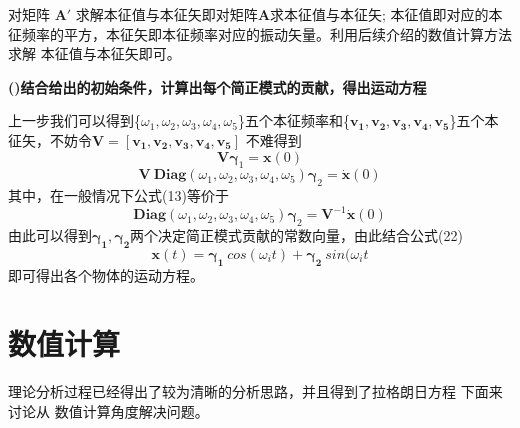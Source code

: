 \documentclass[11pt, a4paper, oneside]{ctexart}
\begin{document}
{    对矩阵 $\boldsymbol A'$ 求解本征值与本征矢即对矩阵$\boldsymbol A$求本征值与本征矢;
    本征值即对应的本征频率的平方，本征矢即本征频率对应的振动矢量。利用后续介绍的数值计算方法求解
    本征值与本征矢即可。




\vspace{5mm}
\textbf{()结合给出的初始条件，计算出每个简正模式的贡献，得出运动方程}
\vspace{5mm}

上一步我们可以得到\{$\omega_1,\omega_2,\omega_3,\omega_4,\omega_5$\}五个本征频率和\{$\boldsymbol{v_1,v_2,v_3,v_4,v_5}$\}五个本征矢，不妨令$\boldsymbol {V}=[\boldsymbol{v_1,v_2,v_3,v_4,v_5}]$
不难得到
\begin{equation}
    \boldsymbol {V} \boldsymbol\gamma_1 = \boldsymbol x(0)
\end{equation}
\begin{equation}
    \boldsymbol {V}\  \boldsymbol {Diag}(\omega_1,\omega_2,\omega_3,\omega_4,\omega_5)\boldsymbol\gamma_2 = \boldsymbol{\dot x}(0) 
\end{equation}
其中，在一般情况下公式(13)等价于
\begin{equation}
    \boldsymbol {Diag}(\omega_1,\omega_2,\omega_3,\omega_4,\omega_5)\boldsymbol\gamma_2 = \boldsymbol {V}^{-1} \boldsymbol{\dot x}(0) 
\end{equation}
由此可以得到$\boldsymbol{\gamma_1,\gamma_2}$两个决定简正模式贡献的常数向量，由此结合公式(22)
$$
    \bm x(t)=\bm{\gamma_{1}}\ cos(\omega_it)+\bm{\gamma_{2}}\ sin(\omega_it
$$
即可得出各个物体的运动方程。

\newpage
\section{数值计算}
{
    理论分析过程已经得出了较为清晰的分析思路，并且得到了拉格朗日方程
    下面来讨论从
    数值计算角度解决问题。


}
}
\end{document}
